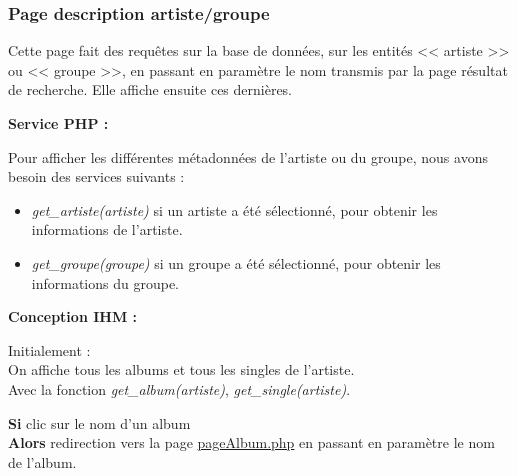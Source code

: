 
        \clearpage

		\subsubsection{Page description artiste/groupe}
            \begin{paragraphe}
                Cette page fait des requêtes sur la base de données, sur les entités << artiste >> ou << groupe >>,
                 en passant en paramètre le nom transmis par la page résultat de recherche. Elle affiche ensuite ces dernières.
            \end{paragraphe}

            \begin{paragraphe}
                \textbf{Service PHP :}
            \end{paragraphe}

            \begin{paragraphe}
                Pour afficher les différentes métadonnées de l'artiste ou du groupe, nous avons besoin des services suivants :
                \begin{itemize}
                        \item \emph{get\_artiste(artiste)} si un artiste a été sélectionné, pour obtenir les informations de l'artiste.
                        \item \emph{get\_groupe(groupe)} si un groupe a été sélectionné, pour obtenir les informations du groupe.
                \end{itemize}
            \end{paragraphe}

			\begin{paragraphe}
				\textbf{Conception IHM :}
			\end{paragraphe}

			\begin{paragraphe}
				Initialement : \\
				On affiche tous les albums et tous les singles de l'artiste. \\
				Avec la fonction \emph{get\_album(artiste)}, \emph{get\_single(artiste)}.
			\end{paragraphe}

			\begin{paragraphe}
				\textbf{Si} clic sur le nom d'un album \\
				\textbf{Alors} redirection vers la page \underline{pageAlbum.php} en passant en paramètre le nom de l'album.
			\end{paragraphe}

